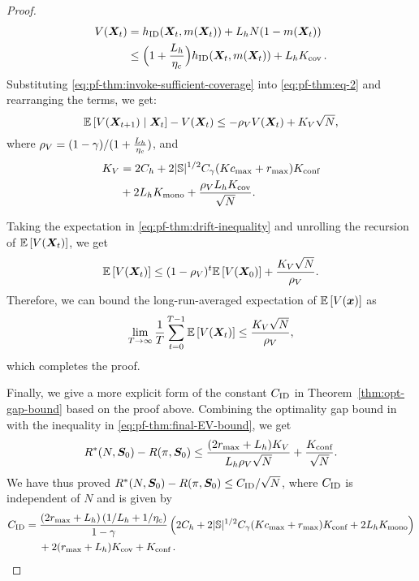 \begin{proof}
    \begin{align}
        \nonumber
        V({\bm{X}}_t) &= h_{\textnormal{ID}}({\bm{X}}_t,m({\bm{X}}_t)) + L_hN(1-m({\bm{X}}_t))\\
        &\leq \Big(1+\frac{L_h}{\eta_c}\Big) h_{\textnormal{ID}}({\bm{X}}_t,m({\bm{X}}_t)) + L_hK_{\text{cov}}\,. \label{eq:pf-thm:invoke-sufficient-coverage}
    \end{align}
    Substituting \eqref{eq:pf-thm:invoke-sufficient-coverage} into \eqref{eq:pf-thm:eq-2} and rearranging the terms, we get: 
    \begin{equation}
        \label{eq:pf-thm:drift-inequality}
        \mathbb{E}\left[V({\bm{X}}_{t+1}) \;|\; {\bm{X}}_t\right]-V({\bm{X}}_t) \leq -\rho_V V({\bm{X}}_t) + K_V \sqrt{N}, 
    \end{equation}
    where $\rho_V = (1-\gamma) / (1+\frac{L_h}{\eta_c})$, and 
    \begin{align*}
        K_V &= 2C_h +2\lvert\mathbb{S}\rvert^{1/2} C_{\gamma}(Kc_{\max}+r_{\max})K_{\text{conf}}\\
        &+2L_hK_{\text{mono}}+ \frac{\rho_V L_h K_{\text{cov}}}{\sqrt{N}}.  
    \end{align*}
    
    Taking the expectation in \eqref{eq:pf-thm:drift-inequality} and unrolling the recursion of $\mathbb{E}\left[V({\bm{X}}_t)\right]$, we get
    \begin{equation*}
        \mathbb{E}\left[V({\bm{X}}_{t})\right] \leq (1-\rho_V)^t \mathbb{E}\left[V({\bm{X}}_0)\right] + \frac{K_V\sqrt{N}}{\rho_V}. 
    \end{equation*}
    Therefore, we can bound the long-run-averaged expectation of $\mathbb{E}\left[V(\bm{x})\right]$ as 
    \begin{equation}
        \label{eq:pf-thm:final-EV-bound}
        \lim_{T\to\infty} \frac{1}{T} \sum_{t=0}^{T-1} \mathbb{E}\left[V({\bm{X}}_{t})\right] \leq \frac{K_V\sqrt{N}}{\rho_V},
    \end{equation}
    which completes the proof.

    Finally, we give a more explicit form of the constant $C_{\textnormal{ID}}$ in Theorem~\ref{thm:opt-gap-bound} based on the proof above.
    Combining the optimality gap bound in  with the inequality in \eqref{eq:pf-thm:final-EV-bound}, we get
    \begin{equation*}
        R^*(N,\bm{S}_0)-R(\pi,\bm{S}_0)\leq \frac{(2r_{\max}+L_h)K_V}{L_h \rho_V \sqrt{N}} + \frac{K_{\text{conf}}}{\sqrt{N}}. 
    \end{equation*}
    We have thus proved $R^*(N,\bm{S}_0)-R(\pi,\bm{S}_0) \leq C_{\textnormal{ID}} / \sqrt{N}$, where $C_{\textnormal{ID}}$ is independent of $N$ and is given by
    \begin{align*}
         C_{\textnormal{ID}}&=\frac{\left(2r_{\max} + L_h\right)\left(1/L_h + 1/\eta_c\right)}{1-\gamma} \left(2C_h+2\lvert\mathbb{S}\rvert^{1/2} C_{\gamma}(Kc_{\max}+r_{\max})K_{\text{conf}}+2L_hK_{\text{mono}}\right) \\
         &\mspace{23mu} + 2(r_{\max}+L_h)K_{\text{cov}} + K_{\text{conf}}\,.
    \end{align*}  
\end{proof}

